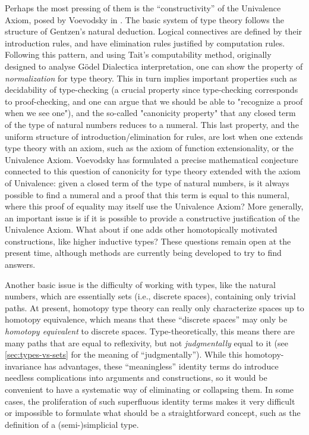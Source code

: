 {Perhaps the most pressing of them is the ``constructivity'' of the Univalence Axiom, posed by Voevodsky in \cite{Vo2012}.
The basic system of type theory follows the structure of Gentzen's natural deduction. Logical connectives are defined by their introduction rules, and have elimination rules justified by computation rules. Following this pattern, and using Tait's computability method, originally designed to analyse G\"odel Dialectica interpretation, one can show the property of {\em normalization} for type theory. This in turn implies important properties such as decidability of type-checking (a crucial property since type-checking corresponds to proof-checking, and one can argue that we should be able to "recognize a proof when we see one"), and the so-called "canonicity property" that any closed term of the type of natural numbers reduces to a numeral. This last property, and the uniform structure of introduction/elimination for rules, are lost when one extends type theory with an axiom, such as the axiom of function extensionality, or the Univalence Axiom. Voevodsky has formulated a precise mathematical conjecture connected to this question of canonicity for type theory extended with the axiom of Univalence: given a closed term of the type of natural numbers, is it always possible to find a numeral and a proof that this term is equal to this numeral, where this proof of equality may itself use the Univalence Axiom? More generally, an important issue is if it is possible to provide a constructive justification of the Univalence Axiom.
What about if one adds other homotopically motivated constructions, like higher inductive types?
These questions remain open at the present time, although methods are currently being developed to try to find answers.

Another basic issue is the difficulty of working with types, like the natural numbers, which are essentially sets (i.e., discrete spaces), containing only trivial paths.
At present, homotopy type theory can really only characterize spaces up to homotopy equivalence, which means that these ``discrete spaces'' may only be \emph{homotopy equivalent} to discrete spaces.
Type-theoretically, this means there are many paths that are equal to reflexivity, but not \emph{judgmentally} equal to it (see \cref{sec:types-vs-sets} for the meaning of ``judgmentally'').
While this homotopy-invariance has advantages, these ``meaningless'' identity terms do introduce needless complications into arguments and constructions, so it would be convenient to have a systematic way of eliminating or collapsing them.
In some cases, the proliferation of such superfluous identity terms makes it very difficult or impossible to formulate what should be a straightforward concept, such as the definition of a (semi-)simplicial type.

}
